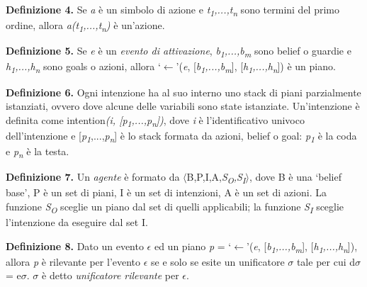 \smallskip
\textbf{Definizione 4.} Se \textit{a} \`e un simbolo di azione e \textit{t\textsubscript{1},...,t\textsubscript{n}} sono termini del primo ordine, allora \textit{a(t\textsubscript{1},...,t\textsubscript{n})} \`e un'azione.

\smallskip
\textbf{Definizione 5.}
Se \textit{e} \`e un \textit{evento di attivazione}, \textit{b\textsubscript{1},...,b\textsubscript{m}} sono belief o guardie e \textit{h\textsubscript{1},...,h\textsubscript{n}} sono goals o azioni, allora `$\leftarrow$'(\textit{e}, [\textit{b\textsubscript{1},...,b\textsubscript{m}}], [\textit{h\textsubscript{1},...,h\textsubscript{n}}]) \`e un piano.

\smallskip
\textbf{Definizione 6.} Ogni intenzione ha al suo interno uno stack di piani parzialmente istanziati, ovvero dove alcune delle variabili sono state istanziate. Un'intenzione \`e definita come intention\textit{(i, [\textit{p\textsubscript{1}},...,\textit{p\textsubscript{n}}])}, dove \textit{i} \`e l'identificativo univoco dell'intenzione e [\textit{p\textsubscript{1}},...,\textit{p\textsubscript{n}}] \`e lo stack formata da azioni, belief o goal: \textit{p\textsubscript{1}} \`e la coda e \textit{p\textsubscript{n}} \`e la testa.

\smallskip
\textbf{Definizione 7.} Un \textit{agente} \`e formato da $\langle$B,P,I,A,\textit{S\textsubscript{O},S\textsubscript{I}}$\rangle$, dove B \`e una `belief base', P \`e un set di piani, I \`e un set di intenzioni, A \`e un set di azioni. La funzione \textit{S\textsubscript{O}} sceglie un piano dal set di quelli applicabili; la funzione \textit{S\textsubscript{I}} sceglie l'intenzione da eseguire dal set I.

\smallskip
\textbf{Definizione 8.} Dato un evento \textit{$\epsilon$} ed un piano \textit{p} = `$\leftarrow$'(\textit{e}, [\textit{b\textsubscript{1},...,b\textsubscript{m}}], [\textit{h\textsubscript{1},...,h\textsubscript{n}}]), allora \textit{p} \`e rilevante per l'evento \textit{$\epsilon$} se e solo se esite un unificatore $\sigma$ tale per cui d$\sigma$ = e$\sigma$. \textit{$\sigma$} \`e detto \textit{unificatore rilevante} per \textit{$\epsilon$}.

